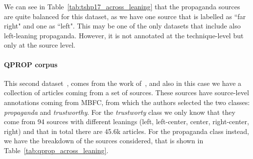 We can see in Table~\ref{tab:tshp17_across_leaning} that the propaganda sources are quite balanced for this dataset, as we have one source that is labelled as ``far right" and one as ``left".
This may be one of the only datasets that include also left-leaning propaganda. However, it is not annotated at the technique-level but only at the source level.


\paragraph{QPROP corpus}

This second dataset~\citep{alberto_barron_cedeno_2019_3271522}, comes from the work of~\cite{barron2019proppy}, and also in this case we have a collection of articles coming from a set of sources. These sources have source-level annotations coming from MBFC, from which the authors selected the two classes: \emph{propaganda} and \emph{trustworthy}.
For the \textit{trustworty} class we only know that they come from 94 sources with different leanings (left, left-center, center, right-center, right) and that in total there are 45.6k articles.
For the propaganda class instead, we have the breakdown of the sources considered, that is shown in Table~\ref{tab:qprop_across_leaning}.



